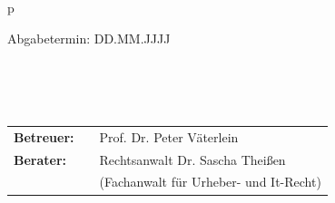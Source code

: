 \begin{center}
\begin{tabular}{p{\textwidth}}
\begin{center}
\large{Abgabetermin: DD.MM.JJJJ}
\end{center}

\\
\\
\\

\begin{center}
\begin{tabular}{lll}
\textbf{Betreuer:} & & Prof. Dr. Peter Väterlein\\
\textbf{Berater:} & &Rechtsanwalt Dr. Sascha Theißen\\
& &(Fachanwalt für Urheber- und It-Recht)
\end{tabular}
\end{center}

\end{tabular}
\end{center}
